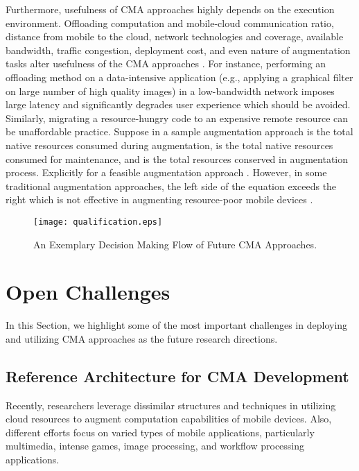 \documentclass[publish]{IEEEtran}
\begin{document}
Furthermore, usefulness of CMA approaches highly depends on the execution environment. Offloading computation and mobile-cloud communication ratio, distance from mobile to the cloud, network technologies and coverage, available bandwidth, traffic congestion, deployment cost, and even nature of augmentation tasks alter usefulness of the CMA approaches \cite{Kumar2010}. For instance, performing an offloading method on a data-intensive application (e.g., applying a graphical filter on large number of high quality images) in a low-bandwidth network imposes large latency and significantly degrades user experience which should be avoided. Similarly, migrating a resource-hungry code to an expensive remote resource can be unaffordable practice. Suppose in a sample augmentation approach  is the total native resources consumed during augmentation,  is the total native resources consumed for maintenance, and  is the total resources conserved in augmentation process. Explicitly for a feasible augmentation approach . However, in some traditional augmentation approaches, the left side of the equation exceeds the right which is not effective in augmenting resource-poor mobile devices \cite{Sharifi2011}. 

\begin{figure}[t]
\begin{center}
\texttt{[image: qualification.eps]}
\caption{An Exemplary Decision Making Flow of Future CMA Approaches.} \label{qualification}
\end{center}
\end{figure}


\section{Open Challenges} \label{openissues}
In this Section, we highlight some of the most important challenges in deploying and utilizing CMA approaches as the future research directions.

\subsection{Reference Architecture for CMA Development}
Recently, researchers leverage dissimilar structures and techniques in utilizing cloud resources to augment computation capabilities of mobile devices. Also, different efforts focus on varied types of mobile applications, particularly multimedia, intense games, image processing, and workflow processing applications. 
\end{document}
